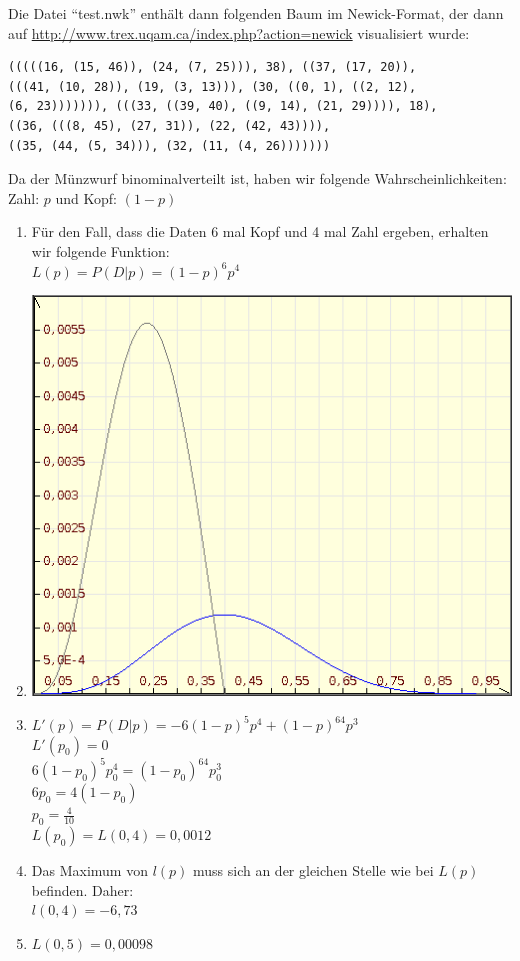 \documentclass{homework}
\begin{document}
\begin{enumerate}
\begin{enumerate}
Die Datei "`test.nwk"' enthält dann folgenden Baum im Newick-Format, der dann auf
\url{http://www.trex.uqam.ca/index.php?action=newick} visualisiert wurde:

\begin{verbatim}
(((((16, (15, 46)), (24, (7, 25))), 38), ((37, (17, 20)),
(((41, (10, 28)), (19, (3, 13))), (30, ((0, 1), ((2, 12),
(6, 23))))))), (((33, ((39, 40), ((9, 14), (21, 29)))), 18),
((36, (((8, 45), (27, 31)), (22, (42, 43)))),
((35, (44, (5, 34))), (32, (11, (4, 26)))))))
\end{verbatim}

\end{enumerate}

Da der Münzwurf binominalverteilt ist, haben wir folgende Wahrscheinlichkeiten:\\
Zahl: $p$ und Kopf: $(1-p)$ 
\begin{enumerate}
\item
	Für den Fall, dass die Daten 6 mal Kopf und 4 mal Zahl ergeben, erhalten wir folgende Funktion:\\
	$L(p) = P(D|p) = (1-p)^6p^4$
\item
	\includegraphics[scale=0.3]{u3_aufg4b.png} 
\item
	$L'(p) = P(D|p) = -6(1-p)^5p^4+(1-p)^64p^3$\\
	$L'(p_0) = 0$\\
	$6(1-p_0)^5p_0^4 = (1-p_0)^64p_0^3$\\
	$6p_0 = 4(1-p_0)$\\
	$p_0 = \frac{4}{10}$\\
	$L(p_0) = L(0,4) = 0,0012$\\
\item
	Das Maximum von $l(p)$ muss sich an der gleichen Stelle wie bei $L(p)$ befinden. Daher: \\
	$l(0,4) = -6,73$
\item
	$L(0,5) = 0,00098$
\end{enumerate}

\end{enumerate}
\end{document}
